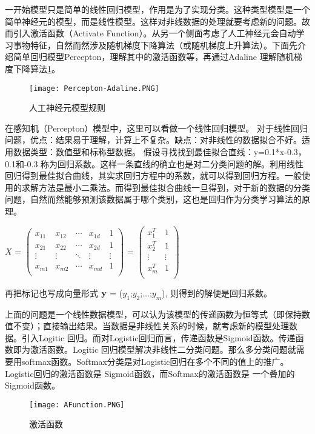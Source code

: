 一开始模型只是简单的线性回归模型，作用是为了实现分类。这种类型模型是一个简单神经元的模型，而是线性模型。这样对非线数据的处理就要考虑新的问题。故而引入激活函数（Activate Function）。从另一个侧面考虑了人工神经元会自动学习事物特征，自然而然涉及随机梯度下降算法（或随机梯度上升算法）。下面先介绍简单回归模型Percepton，理解其中的激活函数等，再通过Adaline 理解随机梯度下降算法\ref{fig3-PA}。

\begin{figure}
\begin{center}
\texttt{[image: Percepton-Adaline.PNG]}
\caption{人工神经元模型规则}
\label{fig3-PA}
\end{center}
\end{figure}

在感知机（Percepton）模型中，这里可以看做一个线性回归模型。
对于线性回归问题，优点：结果易于理解，计算上不复杂。缺点：对非线性的数据拟合不好。适用数据类型：数值型和标称型数据。
假设寻找找到最佳拟合直线：y=0.1*x-0.3， 0.1和-0.3 称为回归系数。这样一条直线的确立也是对二分类问题的解。利用线性回归得到最佳拟合曲线，其实求回归方程中的系数，就可以得到回归方程。一般使用的求解方法是最小二乘法。而得到最佳拟合曲线一旦得到，对于新的数据的分类问题，自然而然能够预测该数据属于哪个类别，这也是回归作为分类学习算法的原理。

$X$ =
$\left(
  \begin{array}{ccccc}
    x_{11} & x_{12} & \cdots & x_{1d} & 1 \\
    x_{21} & x_{22} & \cdots & x_{2d} & 1 \\
    \vdots & \vdots & \ddots & \vdots & \vdots \\
    x_{m1} & x_{m2} & \cdots & x_{md} & 1 \\
  \end{array}
\right)
$
=
$\left(
   \begin{array}{cc}
     x^{T}_{1} & 1 \\
     x^{T}_{2} & 1 \\
     \vdots & \vdots \\
     x^{T}_{m} & 1 \\
   \end{array}
 \right)
 $

再把标记也写成向量形式 $\bf{y}$ = ($y_{1}$;$y_{2}$;$\ldots$;$y_{m}$), 则得到的解便是回归系数。

上面的问题是一个线性数据模型，可以认为该模型的传递函数为恒等式（即保持数值不变）；直接输出结果。当数据是非线性关系的时候，就考虑新的模型处理数据。引入Logitic 回归。而对Logistic回归而言，传递函数是Sigmoid函数。传递函数即为激活函数。Logitic 回归模型解决非线性二分类问题。那么多分类问题就需要用softmax函数。Softmax分类是对Logistic回归在多个不同的值上的推广。 Logistic回归的激活函数是 Sigmoid函数，而Softmax的激活函数是 一个叠加的Sigmoid函数。
\begin{figure}[htbp]
\begin{center}
\texttt{[image: AFunction.PNG]}
\caption{激活函数}
\label{fig3-AF}
\end{center}
\end{figure}

